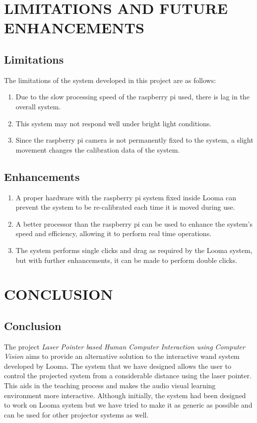 \documentclass[12pt, a4paper]{article}
\begin{document}
\section{LIMITATIONS AND FUTURE ENHANCEMENTS}
\subsection{Limitations}
The limitations of the system developed in this project are as follows:

\begin{enumerate}
\item Due to the slow processing speed of the raspberry pi used, there is lag in the overall system. 
\item This system may not respond well under bright light conditions.
\item Since the raspberry pi camera is not permanently fixed to the system, a slight movement changes the calibration data of the system.

\end{enumerate}

\subsection{Enhancements}
\begin{enumerate}
\item A proper hardware with the raspberry pi system fixed inside Looma can prevent the system to be re-calibrated each time it is moved during use.
\item A better processor than the raspberry pi can be used to enhance the system’s speed and efficiency, allowing it to perform real time operations.
\item The system performs single clicks and drag as required by the Looma system, but with further enhancements, it can be made to perform double clicks.
\end{enumerate}
\newpage
\section{CONCLUSION}
\subsection{Conclusion}
The project \emph{Laser Pointer based Human Computer Interaction using Computer Vision} aims to provide an alternative solution to the interactive wand system developed by Looma. The system that we have designed allows the user to control the projected system from a considerable distance using the laser pointer. This aids in the teaching process and makes the audio visual learning environment more interactive. Although initially, the system had been designed to work on Looma system but we have tried to make it as generic as possible and can be used for other projector systems as well. 
\end{document}
